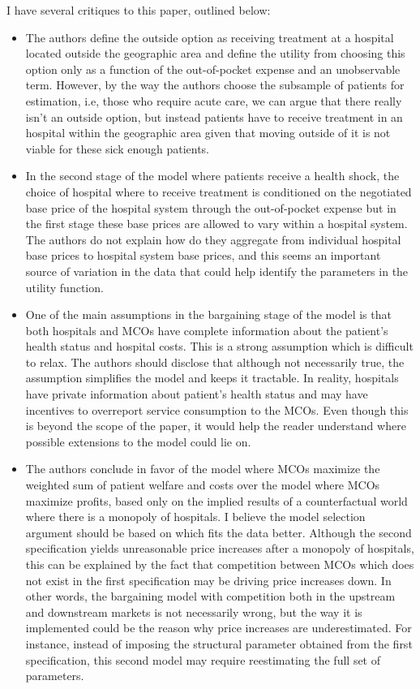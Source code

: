 \documentclass[12pt,english]{article}
\begin{document}
I have several critiques to this paper, outlined below:
\begin{itemize}
\item The authors define the outside option as receiving treatment at a hospital located outside the geographic area and define the utility from choosing this option only as a function of the out-of-pocket expense and an unobservable term. However, by the way the authors choose the subsample of patients for estimation, i.e, those who require acute care, we can argue that there really isn't an outside option, but instead patients have to receive treatment in an hospital within the geographic area given that moving outside of it is not viable for these sick enough patients.
\item In the second stage of the model where patients receive a health shock, the choice of hospital where to receive treatment is conditioned on the negotiated base price of the hospital system through the out-of-pocket expense but in the first stage these base prices are allowed to vary within a hospital system. The authors do not explain how do they aggregate from individual hospital base prices to hospital system base prices, and this seems an important source of variation in the data that could help identify the parameters in the utility function. 
\item One of the main assumptions in the bargaining stage of the model is that both hospitals and MCOs have complete information about the patient's health status and hospital costs. This is a strong assumption which is difficult to relax. The authors should disclose that although not necessarily true, the assumption simplifies the model and keeps it tractable. In reality, hospitals have private information about patient's health status and may have incentives to overreport service consumption to the MCOs. Even though this is beyond the scope of the paper, it would help the reader understand where possible extensions to the model could lie on.
\item The authors conclude in favor of the model where MCOs maximize the weighted sum of patient welfare and costs over the model where MCOs maximize profits,  based only on the implied results of a counterfactual world where there is a monopoly of hospitals. I believe the model selection argument should be based on which fits the data better. Although the second specification yields unreasonable price increases after a monopoly of hospitals, this can be explained by the fact that competition between MCOs which does not exist in the first specification may be driving price increases down. In other words, the bargaining model with competition both in the upstream and downstream markets is not necessarily wrong, but the way it is implemented could be the reason why price increases are underestimated. For instance, instead of  imposing the structural parameter obtained from the first specification, this second model may require reestimating the full set of parameters.

\end{itemize}
\end{document}
